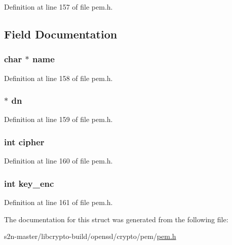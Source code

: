 Definition at line 157 of file pem.\+h.



\subsection{Field Documentation}
\subsubsection[{\texorpdfstring{name}{name}}]{\setlength{\rightskip}{0pt plus 5cm}char $\ast$ name}\hypertarget{structpem__recip__st_ad547fb8186b526cb1b588daad4334fbe}{}\label{structpem__recip__st_ad547fb8186b526cb1b588daad4334fbe}


Definition at line 158 of file pem.\+h.

\subsubsection[{\texorpdfstring{dn}{dn}}]{ $\ast$ dn}\hypertarget{structpem__recip__st_a5d643db297d66b994cafc94d6a2f37bb}{}\label{structpem__recip__st_a5d643db297d66b994cafc94d6a2f37bb}


Definition at line 159 of file pem.\+h.

\subsubsection[{\texorpdfstring{cipher}{cipher}}]{\setlength{\rightskip}{0pt plus 5cm}int cipher}\hypertarget{structpem__recip__st_aa66cc9b6b16f917a5c9f7597cf6e427a}{}\label{structpem__recip__st_aa66cc9b6b16f917a5c9f7597cf6e427a}


Definition at line 160 of file pem.\+h.

\subsubsection[{\texorpdfstring{key\+\_\+enc}{key_enc}}]{\setlength{\rightskip}{0pt plus 5cm}int key\+\_\+enc}\hypertarget{structpem__recip__st_a721ddcfd0092c7f0f4b6bd1289e37174}{}\label{structpem__recip__st_a721ddcfd0092c7f0f4b6bd1289e37174}


Definition at line 161 of file pem.\+h.



The documentation for this struct was generated from the following file\+:\begin{DoxyCompactItemize}
\item 
s2n-\/master/libcrypto-\/build/openssl/crypto/pem/\hyperlink{crypto_2pem_2pem_8h}{pem.\+h}\end{DoxyCompactItemize}
